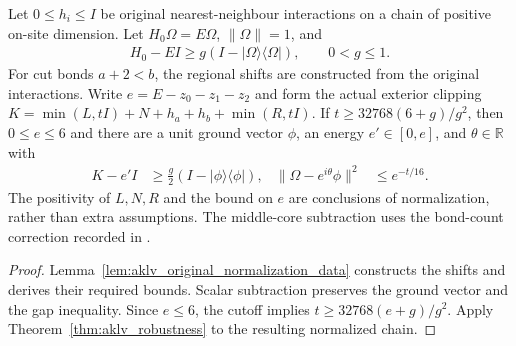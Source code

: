 \begin{theorem}
    \label{thm:aklv_original_chain_robustness}
    \leanok
    Let $0\le h_i\le I$ be original nearest-neighbour interactions on a
    chain of positive on-site dimension. Let $H_0\Omega=E\Omega$,
    $\|\Omega\|=1$, and
    \begin{align}
        H_0-EI\ge g(I-|\Omega\rangle\langle\Omega|),\qquad 0<g\le1.
    \end{align}
    For cut bonds $a+2<b$, the regional shifts are constructed from
    the original interactions. Write $e=E-z_0-z_1-z_2$ and form the
    actual exterior clipping
    $K=\min(L,tI)+N+h_a+h_b+\min(R,tI)$.
    If $t\ge32768(6+g)/g^2$, then $0\le e\le6$ and there are a unit
    ground vector $\phi$, an energy $e'\in[0,e]$, and $\theta\in\mathbb R$
    with
    \begin{align}
        K-e'I                        & \ge\frac g2(I-|\phi\rangle\langle\phi|), &
        \|\Omega-e^{i\theta}\phi\|^2 & \le e^{-t/16}.
    \end{align}
    The positivity of $L,N,R$ and the bound on $e$ are conclusions of
    normalization, rather than extra assumptions. The middle-core
    subtraction uses the bond-count correction recorded in
    \cite{gap:aklv13_robustness_constants}.
\end{theorem}
\begin{proof}
    \leanok
    Lemma~\ref{lem:aklv_original_normalization_data} constructs the shifts
    and derives their required bounds. Scalar subtraction preserves
    the ground vector and the gap inequality. Since $e\le6$, the cutoff
    implies $t\ge32768(e+g)/g^2$. Apply
    Theorem~\ref{thm:aklv_robustness} to the resulting normalized chain.
\end{proof}

